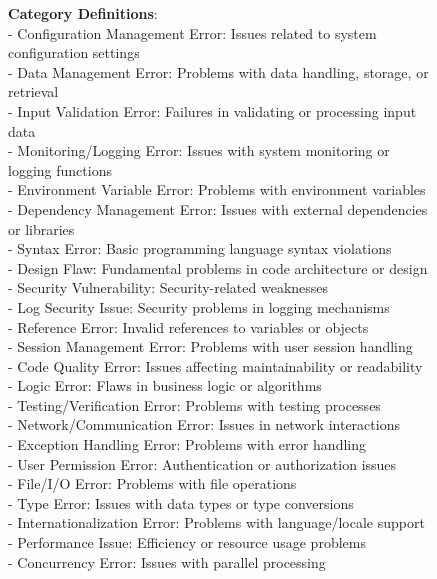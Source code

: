 \documentclass[11pt, a4paper, logo, copyright, nonumbering, amsart]{map}
\begin{document}
\begin{CJK*}{UTF8}{gbsn}
\begin{figure*}[h!]
\begin{center}
\begin{tcolorbox}[width=1\textwidth, colback=lightblue, title={\textbf{Identifying Programming Error Types Prompt}}]
    \textbf{Category Definitions}:\\
    - Configuration Management Error: Issues related to system configuration settings\\
    - Data Management Error: Problems with data handling, storage, or retrieval\\
    - Input Validation Error: Failures in validating or processing input data\\
    - Monitoring/Logging Error: Issues with system monitoring or logging functions\\
    - Environment Variable Error: Problems with environment variables\\
    - Dependency Management Error: Issues with external dependencies or libraries\\
    - Syntax Error: Basic programming language syntax violations\\
    - Design Flaw: Fundamental problems in code architecture or design\\
    - Security Vulnerability: Security-related weaknesses\\
    - Log Security Issue: Security problems in logging mechanisms\\
    - Reference Error: Invalid references to variables or objects\\
    - Session Management Error: Problems with user session handling\\
    - Code Quality Error: Issues affecting maintainability or readability\\
    - Logic Error: Flaws in business logic or algorithms\\
    - Testing/Verification Error: Problems with testing processes\\
    - Network/Communication Error: Issues in network interactions\\
    - Exception Handling Error: Problems with error handling\\
    - User Permission Error: Authentication or authorization issues\\
    - File/I/O Error: Problems with file operations\\
    - Type Error: Issues with data types or type conversions\\
    - Internationalization Error: Problems with language/locale support\\
    - Performance Issue: Efficiency or resource usage problems\\
    - Concurrency Error: Issues with parallel processing\\
    

\end{tcolorbox}
\end{center}
\end{figure*}
\end{CJK*}
\end{document}
